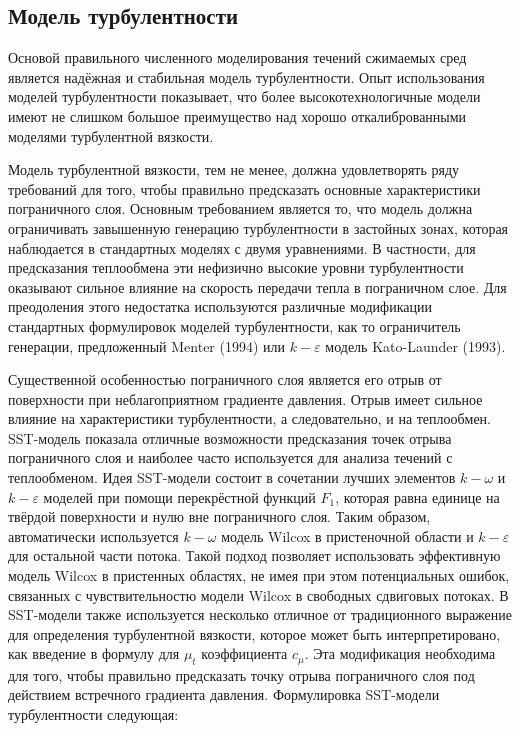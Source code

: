 	\subsection{Модель турбулентности}
		\hspace{2em}
		Основой правильного численного моделирования течений сжимаемых сред является надёжная и стабильная модель турбулентности. Опыт использования моделей турбулентности показывает, что более высокотехнологичные модели имеют не слишком большое преимущество над хорошо откалиброванными моделями турбулентной вязкости.
		
		Модель турбулентной вязкости, тем не менее, должна удовлетворять ряду требований для того, чтобы правильно предсказать основные характеристики пограничного слоя. Основным требованием является то, что модель должна ограничивать завышенную генерацию турбулентности в застойных зонах, которая наблюдается в стандартных моделях с двумя уравнениями. В частности, для предсказания теплообмена эти нефизично высокие уровни турбулентности оказывают сильное влияние на скорость передачи тепла в пограничном слое. Для преодоления этого недостатка используются различные модификации стандартных формулировок моделей турбулентности, как то ограничитель генерации, предложенный Menter (1994) или $k-\varepsilon$ модель Kato-Launder (1993).
		
		Существенной особенностью пограничного слоя является его отрыв от поверхности при неблагоприятном градиенте давления. Отрыв имеет сильное влияние на характеристики турбулентности, а следовательно, и на теплообмен. SST-модель показала отличные	 возможности предсказания точек отрыва пограничного слоя и наиболее часто используется для анализа течений с теплообменом. Идея SST-модели состоит в сочетании лучших элементов $k-\omega$ и $k-\varepsilon$ моделей при помощи перекрёстной функций $F_1$, которая равна единице на твёрдой поверхности и нулю вне пограничного слоя. Таким образом, автоматически используется $k-\omega$ модель Wilcox  в пристеночной области и $k-\varepsilon$ для остальной части потока. Такой подход позволяет использовать эффективную модель Wilcox в пристенных областях, не имея при этом потенциальных ошибок, связанных с чувствительностю модели Wilcox в свободных сдвиговых потоках. В SST-модели также используется несколько отличное от традиционного выражение для определения турбулентной вязкости, которое может быть интерпретировано, как введение в формулу для $\mu_t$ коэффициента $c_{\mu}$. Эта модификация необходима для того, чтобы правильно предсказать точку отрыва пограничного слоя под действием встречного градиента давления. \cite{Menter}
		Формулировка SST-модели турбулентности следующая:
		\newpage

